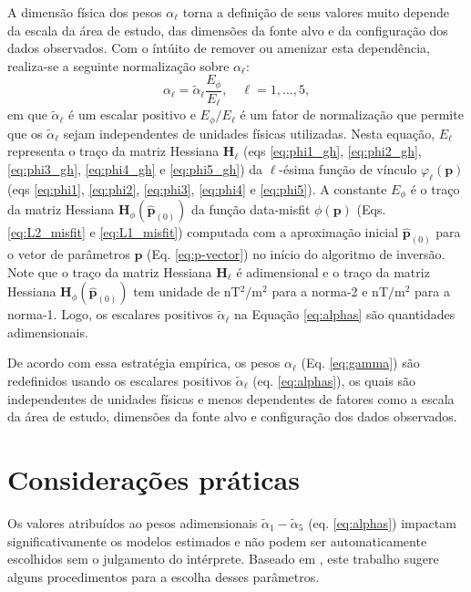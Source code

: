 A dimensão física dos pesos $ \alpha_{\ell}$ torna a definição de seus valores muito depende da escala da área de estudo,
das dimensões da fonte alvo e da configuração dos dados observados.
Com o íntúito de remover ou amenizar esta dependência, realiza-se a seguinte normalização sobre $ \alpha_{\ell} $:
\begin{equation}\label{eq:alphas}
\alpha_{\ell} = \tilde{\alpha}_\ell \frac{E_\phi}{E_\ell}, \quad \ell = 1,\dots, 5,
\end{equation}
em que $\tilde{\alpha}_\ell$ é um escalar positivo e $ E_\phi/E_\ell $ é um fator de normalização que permite que os $\tilde{\alpha}_\ell$ sejam independentes de unidades físicas utilizadas.
Nesta equação, $ E_\ell $ representa o traço da matriz Hessiana $\mathbf{H}_{\ell}$ (eqs \ref{eq:phi1_gh}, \ref{eq:phi2_gh}, \ref{eq:phi3_gh}, \ref{eq:phi4_gh} e \ref{eq:phi5_gh}) da $ \ell $-ésima função de vínculo $\varphi_{\ell}(\mathbf{p})$ (eqs \ref{eq:phi1}, \ref{eq:phi2}, \ref{eq:phi3}, 
\ref{eq:phi4} e \ref{eq:phi5}).
A constante $E_\phi$ é o traço da matriz Hessiana $\mathbf{H}_{\phi}(\hat{\mathbf{p}}_{(0)})$ da função data-misfit $\phi(\mathbf{p})$ (Eqs. \ref{eq:L2_misfit} e \ref{eq:L1_misfit}) computada com a aproximação inicial $\hat{\mathbf{p}}_{(0)}$ para o vetor de parâmetros $ \mathbf{p} $ (Eq. \ref{eq:p-vector}) no início do algoritmo de inversão.
Note que o traço da matriz Hessiana $\mathbf{H}_{\ell}$ é adimensional e o traço da matriz Hessiana $\mathbf{H}_{\phi}(\hat{\mathbf{p}}_{(0)})$ tem unidade de nT$^{2}/$m$^{2}$ para a norma-2 e nT$ / $m$ ^2 $ para a norma-1.
Logo, os escalares positivos $\tilde{\alpha}_\ell$ na Equação \ref{eq:alphas} são quantidades adimensionais.

De acordo com essa estratégia empírica, os pesos $ \alpha_{\ell} $ 
(Eq. \ref{eq:gamma}) são redefinidos usando os escalares positivos $\tilde{\alpha}_\ell$ (eq. \ref{eq:alphas}), os quais são independentes de unidades físicas e menos dependentes de fatores como a escala da área de estudo, dimensões da fonte alvo e configuração dos dados observados.

\section{Considerações práticas}

Os valores atribuídos ao pesos adimensionais $\tilde{\alpha}_{1} - \tilde{\alpha}_{5}$ (eq. \ref{eq:alphas}) impactam significativamente os modelos estimados e não podem ser automaticamente escolhidos sem o julgamento do intérprete.
Baseado em \cite{bastos-2020}, este trabalho sugere alguns procedimentos para a escolha desses parâmetros.

